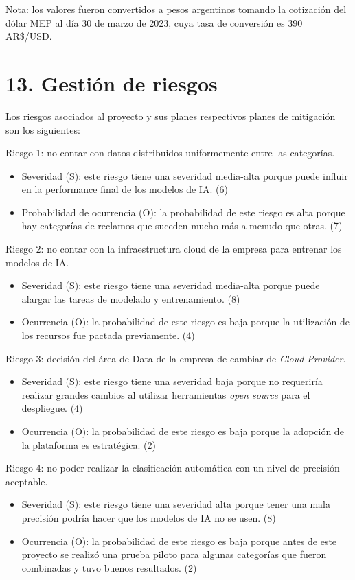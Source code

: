 \documentclass[
11pt, %
]{charter}
\begin{document}
Nota: los valores fueron convertidos a pesos argentinos tomando la cotización del dólar MEP al día 30 de marzo de 2023, cuya tasa de conversión es 390 AR\$/USD.

\section{13. Gestión de riesgos}
\label{sec:riesgos}

Los riesgos asociados al proyecto y sus planes respectivos planes de mitigación son los siguientes:
 
Riesgo 1: no contar con datos distribuidos uniformemente entre las categorías.
\begin{itemize}
	\item Severidad (S): este riesgo tiene una severidad media-alta porque puede influir en la performance final de los modelos de IA. (6)
	\item Probabilidad de ocurrencia (O): la probabilidad de este riesgo es alta porque hay categorías de reclamos que suceden mucho más a menudo que otras. (7)
\end{itemize}   

Riesgo 2: no contar con la infraestructura cloud de la empresa para entrenar los modelos de IA.
\begin{itemize}
	\item Severidad (S): este riesgo tiene una severidad media-alta porque puede alargar las tareas de modelado y entrenamiento. (8)
	\item Ocurrencia (O): la probabilidad de este riesgo es baja porque la utilización de los recursos fue pactada previamente. (4)
\end{itemize}

Riesgo 3: decisión del área de Data de la empresa de cambiar de \textit{Cloud Provider}.
\begin{itemize}
	\item Severidad (S): este riesgo tiene una severidad baja porque no requeriría realizar grandes cambios al utilizar herramientas \textit{open source} para el despliegue. (4)
	\item Ocurrencia (O): la probabilidad de este riesgo es baja porque la adopción de la plataforma es estratégica. (2)
\end{itemize}

Riesgo 4: no poder realizar la clasificación automática con un nivel de precisión aceptable.
\begin{itemize}
	\item Severidad (S): este riesgo tiene una severidad alta porque tener una mala precisión podría hacer que los modelos de IA no se usen. (8)
	\item Ocurrencia (O): la probabilidad de este riesgo es baja porque antes de este proyecto se realizó una prueba piloto para algunas categorías que fueron combinadas y tuvo buenos resultados. (2)
\end{itemize}
\end{document}
